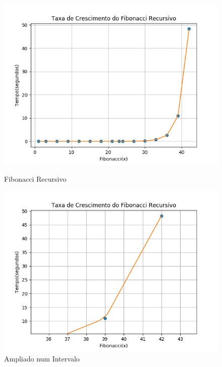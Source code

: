\documentclass[a4paper, 12pt]{article}
\begin{document}
\begin{figure}[h]
\centering
\begin{minipage}[b]{0.45\linewidth}
\includegraphics[width=\linewidth]{../fibonacci_recursivo.png}
\caption{Fibonacci Recursivo}
\end{minipage}
\hfill
\begin{minipage}[b]{0.45\linewidth}
\includegraphics[width=\linewidth]{../fibonacci_recursivo_zoom.png}
\caption{Ampliado num Intervalo}
\end{minipage}
\end{figure}
\newpage
\end{document}
